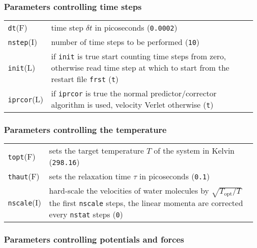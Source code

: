 \documentclass[12pt,a4paper]{article}
\newcommand{\Option}[1]{\texttt{#1}}
\newcommand{\OptionValue}[1]{\texttt{#1}}
\begin{document}
\subsubsection*{Parameters controlling time steps}

\begin{tabularx}{\columnwidth}{p{}X}
  \Option{dt}(F) & time step $\delta t$ in picoseconds (\OptionValue{0.0002})
  \\
  \Option{nstep}(I) & number of time steps to be performed (\OptionValue{10})
  \\
  \Option{init}(L) & if \Option{init} is true start counting time steps from
  zero, otherwise read time step at which to start from the restart file
  \Option{frst} (\OptionValue{t}) \\
  \Option{iprcor}(L) & if \Option{iprcor} is true the normal
  predictor/corrector algorithm is used, velocity Verlet otherwise
  (\OptionValue{t})
\end{tabularx}


\subsubsection*{Parameters controlling the temperature}

\begin{tabularx}{\columnwidth}{p{}X}
  \Option{topt}(F) & sets the target temperature $T$ of the system in Kelvin
  (\OptionValue{298.16}) \\
  \Option{thaut}(F) & sets the relaxation time $\tau$ in picoseconds
  (\OptionValue{0.1}) \\
  \Option{nscale}(I) & hard-scale the velocities of water molecules by
  $\sqrt{T_{\text{opt}}/T}$ the first \Option{nscale} steps, the linear momenta
  are corrected every \Option{nstat} steps (\OptionValue{0}) \\
\end{tabularx}


\subsubsection*{Parameters controlling potentials and forces}
\end{document}
